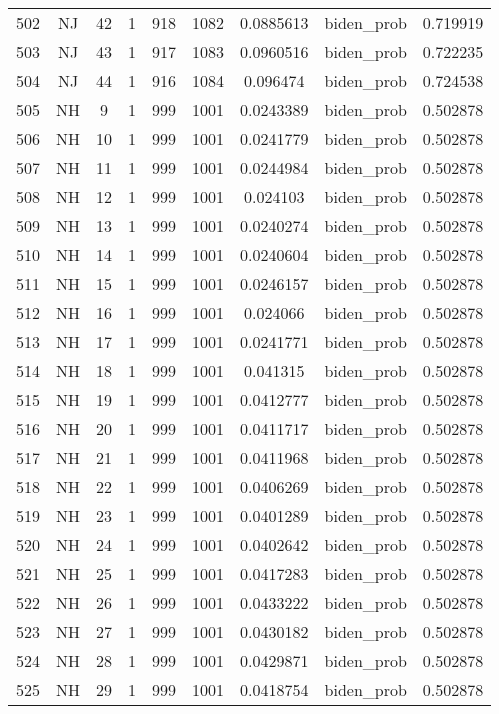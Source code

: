 \documentclass[12pt,a4paper]{article}
\begin{document}
\begin{tabular}{r|cccccccc}
	502 & NJ & 42 & 1 & 918 & 1082 & 0.0885613 & biden\_prob & 0.719919 \\
	503 & NJ & 43 & 1 & 917 & 1083 & 0.0960516 & biden\_prob & 0.722235 \\
	504 & NJ & 44 & 1 & 916 & 1084 & 0.096474 & biden\_prob & 0.724538 \\
	505 & NH & 9 & 1 & 999 & 1001 & 0.0243389 & biden\_prob & 0.502878 \\
	506 & NH & 10 & 1 & 999 & 1001 & 0.0241779 & biden\_prob & 0.502878 \\
	507 & NH & 11 & 1 & 999 & 1001 & 0.0244984 & biden\_prob & 0.502878 \\
	508 & NH & 12 & 1 & 999 & 1001 & 0.024103 & biden\_prob & 0.502878 \\
	509 & NH & 13 & 1 & 999 & 1001 & 0.0240274 & biden\_prob & 0.502878 \\
	510 & NH & 14 & 1 & 999 & 1001 & 0.0240604 & biden\_prob & 0.502878 \\
	511 & NH & 15 & 1 & 999 & 1001 & 0.0246157 & biden\_prob & 0.502878 \\
	512 & NH & 16 & 1 & 999 & 1001 & 0.024066 & biden\_prob & 0.502878 \\
	513 & NH & 17 & 1 & 999 & 1001 & 0.0241771 & biden\_prob & 0.502878 \\
	514 & NH & 18 & 1 & 999 & 1001 & 0.041315 & biden\_prob & 0.502878 \\
	515 & NH & 19 & 1 & 999 & 1001 & 0.0412777 & biden\_prob & 0.502878 \\
	516 & NH & 20 & 1 & 999 & 1001 & 0.0411717 & biden\_prob & 0.502878 \\
	517 & NH & 21 & 1 & 999 & 1001 & 0.0411968 & biden\_prob & 0.502878 \\
	518 & NH & 22 & 1 & 999 & 1001 & 0.0406269 & biden\_prob & 0.502878 \\
	519 & NH & 23 & 1 & 999 & 1001 & 0.0401289 & biden\_prob & 0.502878 \\
	520 & NH & 24 & 1 & 999 & 1001 & 0.0402642 & biden\_prob & 0.502878 \\
	521 & NH & 25 & 1 & 999 & 1001 & 0.0417283 & biden\_prob & 0.502878 \\
	522 & NH & 26 & 1 & 999 & 1001 & 0.0433222 & biden\_prob & 0.502878 \\
	523 & NH & 27 & 1 & 999 & 1001 & 0.0430182 & biden\_prob & 0.502878 \\
	524 & NH & 28 & 1 & 999 & 1001 & 0.0429871 & biden\_prob & 0.502878 \\
	525 & NH & 29 & 1 & 999 & 1001 & 0.0418754 & biden\_prob & 0.502878 \\

\end{tabular}
\end{document}
